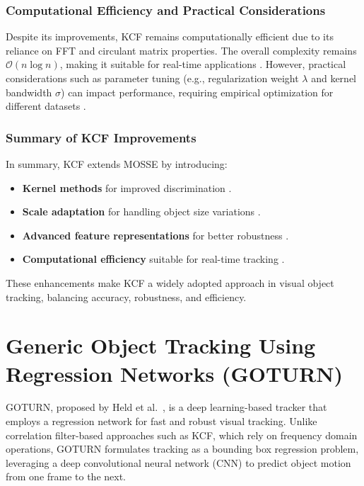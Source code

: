 \subsubsection{Computational Efficiency and Practical Considerations}
Despite its improvements, KCF remains computationally efficient due to its reliance on FFT and circulant matrix properties. The overall complexity remains $\mathcal{O}(n \log n)$, making it suitable for real-time applications \cite{henriques2014high}. However, practical considerations such as parameter tuning (e.g., regularization weight $\lambda$ and kernel bandwidth $\sigma$) can impact performance, requiring empirical optimization for different datasets \cite{danelljan2015learning}.

\subsubsection{Summary of KCF Improvements}
In summary, KCF extends MOSSE by introducing:
\begin{itemize}
    \item \textbf{Kernel methods} for improved discrimination \cite{henriques2014high}.
    \item \textbf{Scale adaptation} for handling object size variations \cite{danelljan2014accurate}.
    \item \textbf{Advanced feature representations} for better robustness \cite{wang2015transferring}.
    \item \textbf{Computational efficiency} suitable for real-time tracking \cite{henriques2014high}.
\end{itemize}
These enhancements make KCF a widely adopted approach in visual object tracking, balancing accuracy, robustness, and efficiency.




\section{Generic Object Tracking Using Regression Networks (GOTURN)}
GOTURN, proposed by Held et al.\ \cite{held2016learning}, is a deep learning-based tracker that employs a regression network for fast and robust visual tracking. Unlike correlation filter-based approaches such as KCF, which rely on frequency domain operations, GOTURN formulates tracking as a bounding box regression problem, leveraging a deep convolutional neural network (CNN) to predict object motion from one frame to the next.

